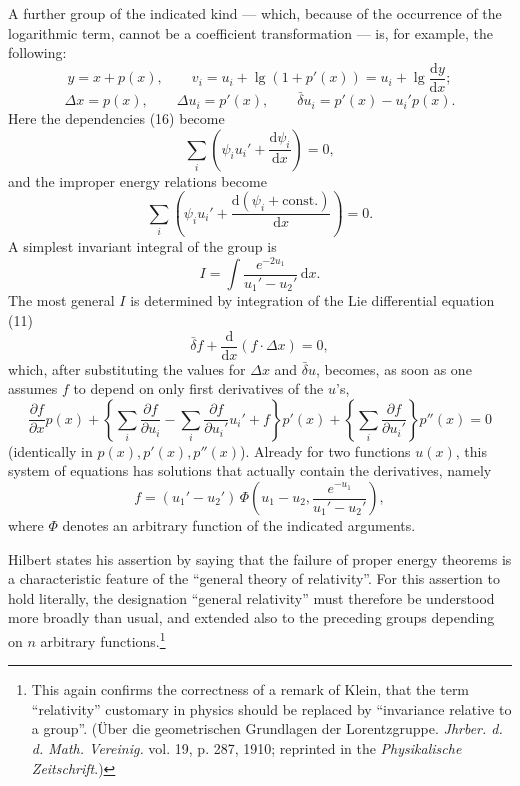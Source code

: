 \documentclass[11pt]{article}
\newcommand{\D}{\Delta}
\providecommand{\dd}{\mathrm d}
\providecommand{\bd}{\bar{\delta}}
\providecommand{\p}{\partial}
\begin{document}
A further group of the indicated kind --- which, because of the occurrence of the logarithmic term, cannot be a coefficient transformation --- is, for example, the following:
\[
y=x+p(x),\qquad
v_i=u_i+\lg(1+p'(x))=u_i+\lg\frac{\dd y}{\dd x};
\]
\[
\D x=p(x),\qquad
\D u_i=p'(x),\qquad
\bd u_i=p'(x)-u_i'p(x).
\]
Here the dependencies (16) become
\[
\sum_i\left(\psi_i u_i'+\frac{\dd\psi_i}{\dd x}\right)=0,
\]
and the improper energy relations become
\[
\sum_i\left(\psi_i u_i'+
\frac{\dd(\psi_i+\mathrm{const.})}{\dd x}\right)=0.
\]
A simplest invariant integral of the group is
\[
I=\int \frac{e^{-2u_1}}{u_1'-u_2'}\,\dd x.
\]
The most general \(I\) is determined by integration of the Lie differential equation (11)
\[
\bd f+\frac{\dd}{\dd x}(f\cdot \D x)=0,
\]
which, after substituting the values for \(\D x\) and \(\bd u\), becomes, as soon as one assumes \(f\) to depend on only first derivatives of the \(u\)'s,
\[
\frac{\p f}{\p x}p(x)
+\left\{\sum_i\frac{\p f}{\p u_i}
-\sum_i\frac{\p f}{\p u_i'}u_i'+f\right\}p'(x)
+\left\{\sum_i\frac{\p f}{\p u_i'}\right\}p''(x)=0
\]
(identically in \(p(x),p'(x),p''(x)\)). Already for two functions \(u(x)\), this system of equations has solutions that actually contain the derivatives, namely
\[
f=(u_1'-u_2')\,
\Phi\!\left(u_1-u_2,\frac{e^{-u_1}}{u_1'-u_2'}\right),
\]
where \(\Phi\) denotes an arbitrary function of the indicated arguments.

Hilbert states his assertion by saying that the failure of proper energy theorems is a characteristic feature of the ``general theory of relativity''. For this assertion to hold literally, the designation ``general relativity'' must therefore be understood more broadly than usual, and extended also to the preceding groups depending on \(n\) arbitrary functions.\footnote{This again confirms the correctness of a remark of Klein, that the term ``relativity'' customary in physics should be replaced by ``invariance relative to a group''. (Über die geometrischen Grundlagen der Lorentzgruppe. \emph{Jhrber. d. d. Math. Vereinig.} vol. 19, p. 287, 1910; reprinted in the \emph{Physikalische Zeitschrift}.)}
\end{document}
